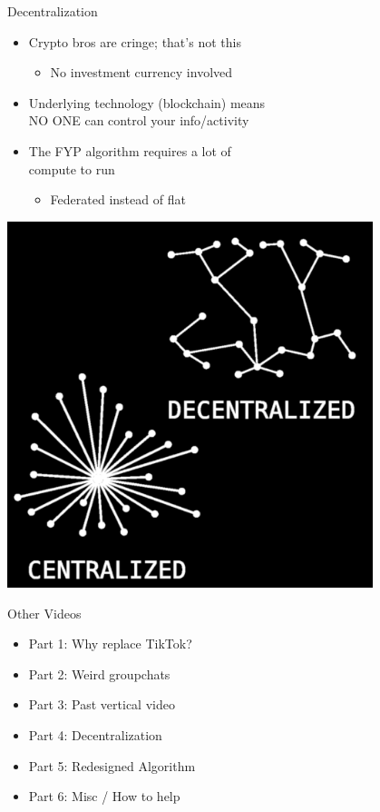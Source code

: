 \documentclass[aspectratio=35]{beamer} %
\begin{document}
\begin{frame}{Decentralization}
\vspace{-0.4in}
\begin{itemize}
    \item Crypto bros are cringe; that's not this
    \begin{itemize}
        \item No investment currency involved
    \end{itemize}
    \item Underlying technology (blockchain) means\\NO ONE can control your info/activity
    \item The FYP algorithm requires a lot of\\compute to run
    \begin{itemize}
        \item Federated instead of flat
    \end{itemize}
\end{itemize}
\centering
\includegraphics[width=0.8\textwidth]{imgs/power_to_people/decentralized.png}
\end{frame}

\begin{frame}{Other Videos}
\centering
\tiny
\vspace{-1.5in}
\begin{itemize}
    \item Part 1: Why replace TikTok?
    \item Part 2: Weird groupchats 
    \item Part 3: Past vertical video
    \item Part 4: Decentralization
    \item Part 5: Redesigned Algorithm
    \item Part 6: Misc / How to help
\end{itemize}
\end{frame}
\end{document}
